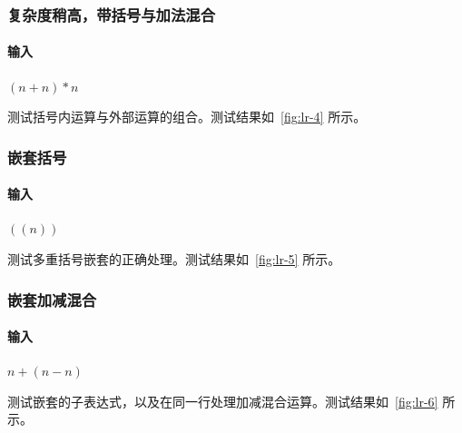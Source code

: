 \subsubsection{复杂度稍高，带括号与加法混合}
\paragraph{输入} $(n+n)*n$

测试括号内运算与外部运算的组合。测试结果如~\autoref{fig:lr-4} 所示。

\subsubsection{嵌套括号}
\paragraph{输入} $((n))$

测试多重括号嵌套的正确处理。测试结果如~\autoref{fig:lr-5} 所示。

\subsubsection{嵌套加减混合}
\paragraph{输入} $n+(n-n)$

测试嵌套的子表达式，以及在同一行处理加减混合运算。测试结果如~\autoref{fig:lr-6} 所示。

